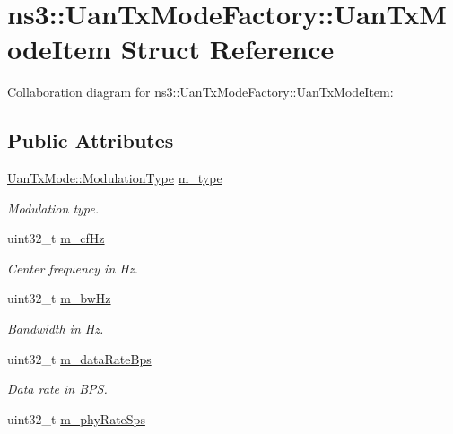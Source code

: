 \hypertarget{structns3_1_1UanTxModeFactory_1_1UanTxModeItem}{}\section{ns3\+:\+:Uan\+Tx\+Mode\+Factory\+:\+:Uan\+Tx\+Mode\+Item Struct Reference}
\label{structns3_1_1UanTxModeFactory_1_1UanTxModeItem}


Collaboration diagram for ns3\+:\+:Uan\+Tx\+Mode\+Factory\+:\+:Uan\+Tx\+Mode\+Item\+:
\subsection*{Public Attributes}
\begin{DoxyCompactItemize}
\item 
\hyperlink{classns3_1_1UanTxMode_a0e822d222c13aa9499c96d9b3ad21223}{Uan\+Tx\+Mode\+::\+Modulation\+Type} \hyperlink{structns3_1_1UanTxModeFactory_1_1UanTxModeItem_a7a3f811351537edba0f1ddfc4ab2fbd2}{m\+\_\+type}
\begin{DoxyCompactList}\small\item\em Modulation type. \end{DoxyCompactList}\item 
uint32\+\_\+t \hyperlink{structns3_1_1UanTxModeFactory_1_1UanTxModeItem_ac64ef029dec721a2c51d6b05acc9c825}{m\+\_\+cf\+Hz}
\begin{DoxyCompactList}\small\item\em Center frequency in Hz. \end{DoxyCompactList}\item 
uint32\+\_\+t \hyperlink{structns3_1_1UanTxModeFactory_1_1UanTxModeItem_aa61e87467ba9e819a7600bb483c7b056}{m\+\_\+bw\+Hz}
\begin{DoxyCompactList}\small\item\em Bandwidth in Hz. \end{DoxyCompactList}\item 
uint32\+\_\+t \hyperlink{structns3_1_1UanTxModeFactory_1_1UanTxModeItem_aa8f9af4b69027cedf7b644100839d551}{m\+\_\+data\+Rate\+Bps}
\begin{DoxyCompactList}\small\item\em Data rate in B\+PS. \end{DoxyCompactList}\item 
uint32\+\_\+t \hyperlink{structns3_1_1UanTxModeFactory_1_1UanTxModeItem_a1d99caec81296fca0a9b7533805a05c5}{m\+\_\+phy\+Rate\+Sps}

\end{DoxyCompactItemize}
